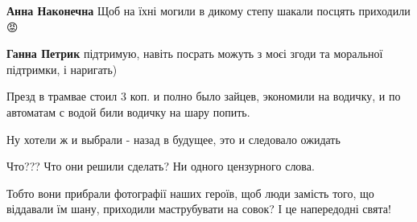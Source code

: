 \begin{itemize}
\begin{itemize}
 
\textbf{Анна Наконечна}
Щоб на їхні могили в дикому степу шакали посцять приходили😡

 
\textbf{Ганна Петрик} підтримую, навіть посрать можуть з моєі згоди та моральної підтримки, і наригать)
\end{itemize}

 
Презд в трамвае стоил 3 коп. и полно было зайцев, экономили на водичку, и по автоматам с водой били водичку на шару попить.

 
Ну хотели ж и выбрали - назад в будущее, это и следовало ожидать

 
Что??? Что они решили сделать? Ни одного цензурного слова. 🤦🤦🤦

 

Тобто вони прибрали фотографії наших героїв, щоб люди замість того, що
віддавали їм шану, приходили маструбувати на совок? І це напередодні свята!


\end{itemize}

